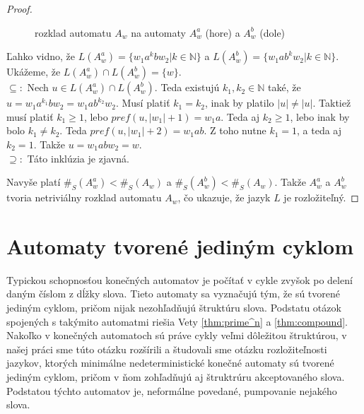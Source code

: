 \begin{proof}
\begin{figure}[H]
\caption{rozklad automatu $ A_w $ na automaty $ A_w^a $ (hore) a $ A_w^b $ (dole)}
\end{figure}

Ľahko vidno, že $ L(A_w^a) = \lbrace w_1a^kbw_2 | k \in \mathbb{N} \rbrace $ a $ L(A_w^b) = \lbrace w_1ab^kw_2 | k \in \mathbb{N} \rbrace$. Ukážeme, že $ L(A_w^a) \cap L(A_w^b) = \lbrace w \rbrace $. \\ 
$ \subseteq: $ Nech $ u \in L(A_w^a) \cap L(A_w^b)  $. Teda existujú $ k_1,k_2 \in \mathbb{N} $ také, že $ u = w_1a^{k_1}bw_2 = w_1ab^{k_2}w_2 $. Musí platiť $ k_1 = k_2 $, inak by platilo $ |u| \neq |u| $. Taktiež musí platiť $ k_1 \geq 1 $, lebo $ pref(u,|w_1|+1) = w_1a $. Teda aj $ k_2 \geq 1 $, lebo inak by bolo $ k_1 \neq k_2 $. Teda $ pref(u,|w_1|+2) = w_1ab $. Z toho nutne $ k_1 = 1 $, a teda aj $ k_2 = 1 $. Takže $ u = w_1abw_2 = w $. \\
$ \supseteq: $ Táto inklúzia je zjavná.
\par
Navyše platí $ \#_S(A_w^a) < \#_S(A_w) $ a $ \#_S(A_w^b) < \#_S(A_w) $. Takže $ A_w^a $ a $ A_w^b $ tvoria netriviálny rozklad automatu $ A_w $, čo ukazuje, že jazyk $ L $ je rozložiteľný.
\end{proof}

\section{Automaty tvorené jediným cyklom}

Typickou schopnosťou konečných automatov je počítať v cykle zvyšok po delení daným číslom z dĺžky slova. Tieto automaty sa vyznačujú tým, že sú tvorené jediným cyklom, pričom nijak nezohľadňujú štruktúru slova. Podstatu otázok spojených s takýmito automatmi riešia Vety \ref{thm:prime^n} a \ref{thm:compound}. Nakoľko v konečných automatoch sú práve cykly veľmi dôležitou štruktúrou, v našej práci sme túto otázku rozšírili a študovali sme otázku rozložiteľnosti jazykov, ktorých minimálne nedeterministické konečné automaty sú tvorené jediným cyklom, pričom v ňom zohľadňujú aj štruktrúru akceptovaného slova. Podstatou týchto automatov je, neformálne povedané, pumpovanie nejakého slova.


